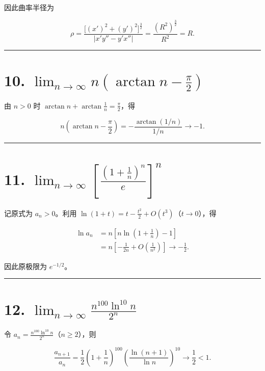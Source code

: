 \documentclass[11pt,a4paper,fontset=windows]{ctexart}
\begin{document}
因此曲率半径为

\[
\rho=\frac{\bigl[(x')^2+(y')^2\bigr]^{\frac32}}
{|x'y''-y'x''|}
=\frac{(R^2)^{\frac32}}{R^2}
=\boxed{R}.
\]
\par{}\vspace{0.5em}\hrule\vspace{0.2em}
\section*{10. \(\displaystyle\lim_{n\to\infty}n\left(\arctan n-\frac\pi2\right)\)}

由 \(n>0\) 时 \(\arctan n+\arctan\frac1n=\frac\pi2\)，得

\[
n\left(\arctan n-\frac\pi2\right)
=-\frac{\arctan(1/n)}{1/n}\longrightarrow\boxed{-1}.
\]

\par{}\vspace{0.5em}\hrule\vspace{0.2em}
\section*{11. \(\displaystyle\lim_{n\to\infty}\left[\frac{(1+\frac1n)^n}{e}\right]^n\)}

记原式为 \(a_n>0\)。利用 \(\ln(1+t)=t-\frac{t^2}{2}+O(t^3)\)（\(t\to0\)），得

\[
\begin{aligned}
\ln a_n
&=n\left[n\ln\left(1+\frac1n\right)-1\right]\\
&=n\left[-\frac1{2n}+O\left(\frac1{n^2}\right)\right]
\longrightarrow-\frac12.
\end{aligned}
\]

因此原极限为 \(\boxed{e^{-1/2}}\)。

\par{}\vspace{0.5em}\hrule\vspace{0.2em}
\section*{12. \(\displaystyle\lim_{n\to\infty}\frac{n^{100}\ln^{10}n}{2^n}\)}

令 \(a_n=\frac{n^{100}\ln^{10}n}{2^n}\)（\(n\ge2\)），则

\[
\frac{a_{n+1}}{a_n}
=\frac12\left(1+\frac1n\right)^{100}
\left(\frac{\ln(n+1)}{\ln n}\right)^{10}
\longrightarrow\frac12<1.
\]
\end{document}

